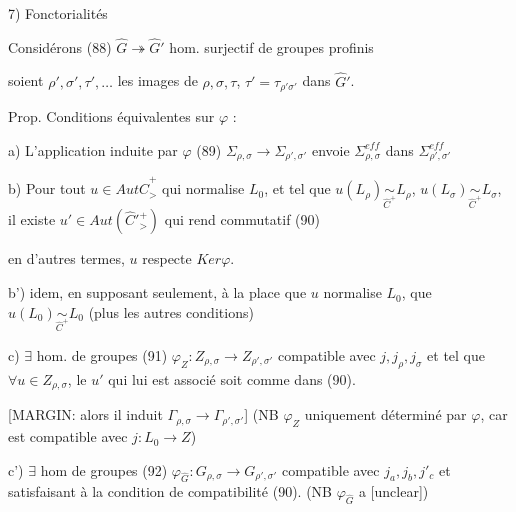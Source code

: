\begin{enumerate}
\newpage



\newpage


7) Fonctorialités

Considérons
(88) $\hat{G} \twoheadrightarrow \hat{G}'$ hom. surjectif de groupes profinis

soient $\rho', \sigma', \tau', \dots$ les images de $\rho, \sigma, \tau$,
$\tau' = \tau_{\rho'\sigma'}$ dans $\hat{G}'$.

Prop. Conditions équivalentes sur $\varphi$ :

a) L'application induite par $\varphi$
(89) $\Sigma_{\rho,\sigma} \to \Sigma_{\rho',\sigma'}$
envoie $\Sigma_{\rho,\sigma}^{eff}$ dans $\Sigma_{\rho',\sigma'}^{eff}$

b) Pour tout $u \in Aut \hat{C}_{>}^+$ qui normalise $L_0$,
et tel que $u(L_\rho) \underset{\hat{C}^+}{\sim} L_\rho$, $u(L_\sigma) \underset{\hat{C}^+}{\sim} L_\sigma$,
il existe $u' \in Aut (\hat{C}'^+_{>})$ qui rend commutatif
(90)
en d'autres termes, $u$ respecte $Ker \varphi$.

b') idem, en supposant seulement, à la place que
$u$ normalise $L_0$, que $u(L_0) \underset{\hat{C}^+}{\sim} L_0$ (plus les autres conditions)

c) $\exists$ hom. de groupes
(91) $\varphi_Z : Z_{\rho,\sigma} \to Z_{\rho',\sigma'}$
compatible avec $j, j_\rho, j_\sigma$ et tel que $\forall u \in Z_{\rho,\sigma}$, le
$u'$ qui lui est associé soit comme dans (90).

[MARGIN: alors il induit $\Gamma_{\rho,\sigma} \to \Gamma_{\rho',\sigma'}$] (NB $\varphi_Z$ uniquement déterminé par $\varphi$, car est compatible avec $j : L_0 \to Z$)

c') $\exists$ hom de groupes
(92) $\varphi_{\hat{G}} : G_{\rho,\sigma} \to G_{\rho',\sigma'}$
compatible avec $j_a, j_b, j'_c$ et satisfaisant à la
condition de compatibilité (90). (NB $\varphi_{\hat{G}}$ a [unclear])

\newpage




\end{enumerate}
